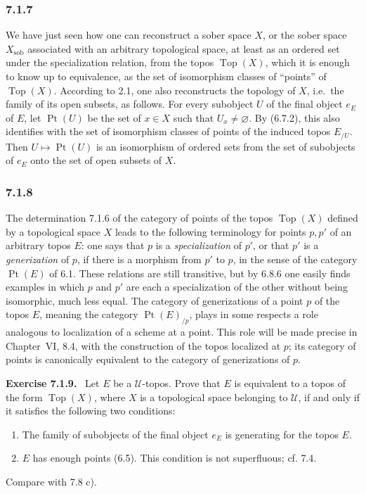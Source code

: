 \documentclass[11pt]{article}
\newcommand{\U}{\mathcal{U}}
\newcommand{\Top}{\operatorname{Top}}
\newcommand{\Pt}{\operatorname{Pt}}
\newcommand{\Ppoint}{\operatorname{Pt}}
\newcommand{\sob}{\operatorname{sob}}
\newcommand{\ie}{i.e.}
\newenvironment{remarktext}[1]{\par\medskip\noindent\textbf{#1.}\ }{\par\medskip}
\begin{document}
\subsubsection*{7.1.7}
We have just seen how one can reconstruct a sober space \(X\), or the sober space \(X_{\sob}\) associated with an arbitrary topological space, at least as an ordered set under the specialization relation, from the topos \(\Top(X)\), which it is enough to know up to equivalence, as the set of isomorphism classes of ``points'' of \(\Top(X)\). According to 2.1, one also reconstructs the topology of \(X\), \ie\ the family of its open subsets, as follows. For every subobject \(U\) of the final object \(e_E\) of \(E\), let \(\Pt(U)\) be the set of \(x\in X\) such that \(U_x\ne\varnothing\). By (6.7.2), this also identifies with the set of isomorphism classes of points of the induced topos \(E_{/U}\). Then \(U\mapsto\Pt(U)\) is an isomorphism of ordered sets from the set of subobjects of \(e_E\) onto the set of open subsets of \(X\).

\subsubsection*{7.1.8}
The determination 7.1.6 of the category of points of the topos \(\Top(X)\) defined by a topological space \(X\) leads to the following terminology for points \(p,p'\) of an arbitrary topos \(E\): one says that \(p\) is a \emph{specialization} of \(p'\), or that \(p'\) is a \emph{generization} of \(p\), if there is a morphism from \(p'\) to \(p\), in the sense of the category \(\Ppoint(E)\) of 6.1. These relations are still transitive, but by 6.8.6 one easily finds examples in which \(p\) and \(p'\) are each a specialization of the other without being isomorphic, much less equal. The category of generizations of a point \(p\) of the topos \(E\), meaning the category \(\Ppoint(E)_{/p}\), plays in some respects a role analogous to localization of a scheme at a point. This role will be made precise in Chapter~VI, 8.4, with the construction of the topos localized at \(p\); its category of points is canonically equivalent to the category of generizations of \(p\).

\begin{remarktext}{Exercise 7.1.9}
Let \(E\) be a \(\U\)-topos. Prove that \(E\) is equivalent to a topos of the form \(\Top(X)\), where \(X\) is a topological space belonging to \(\U\), if and only if it satisfies the following two conditions:
\begin{enumerate}[label=\alph*)]
\item The family of subobjects of the final object \(e_E\) is generating for the topos \(E\).
\item \(E\) has enough points (6.5). This condition is not superfluous; cf. 7.4.
\end{enumerate}
Compare with 7.8 c).
\end{remarktext}
\end{document}
